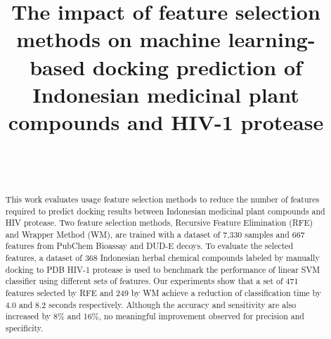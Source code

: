 \documentclass[conference]{IEEEtran}
\begin{document}
\title{The impact of feature selection methods on machine learning-based docking prediction of Indonesian medicinal plant compounds and HIV-1 protease}



\author{
	\and
}

\author{
	\\
	
	\\
	
}

\maketitle

\begin{abstract}
	
	This work evaluates usage feature selection methods to reduce the number of features required to predict docking results between Indonesian medicinal plant compounds and HIV protease. Two feature selection methods, Recursive Feature Elimination (RFE) and Wrapper Method (WM), are trained with a dataset of 7,330 samples and 667 features from PubChem Bioassay and DUD-E decoys. To evaluate the selected features, a dataset of 368 Indonesian herbal chemical compounds labeled by manually docking to PDB HIV-1 protease is used to benchmark the performance of linear SVM classifier using different sets of features. Our experiments show that a set of 471 features selected by RFE and 249 by WM achieve a reduction of classification time by 4.0 and 8.2 seconds respectively. Although the accuracy and sensitivity are also increased by 8\% and 16\%, no meaningful improvement observed for precision and specificity.  
	
\end{abstract}
\end{document}
